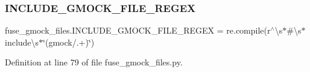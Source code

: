 \subsubsection{\texorpdfstring{I\+N\+C\+L\+U\+D\+E\+\_\+\+G\+M\+O\+C\+K\+\_\+\+F\+I\+L\+E\+\_\+\+R\+E\+G\+EX}{INCLUDE\_GMOCK\_FILE\_REGEX}}
{\footnotesize\ttfamily fuse\+\_\+gmock\+\_\+files.\+I\+N\+C\+L\+U\+D\+E\+\_\+\+G\+M\+O\+C\+K\+\_\+\+F\+I\+L\+E\+\_\+\+R\+E\+G\+EX = re.\+compile(r\textquotesingle{}$^\wedge$\textbackslash{}s$\ast$\#\textbackslash{}s$\ast$include\textbackslash{}s$\ast$\char`\"{}(gmock/.+)\char`\"{}\textquotesingle{})}



Definition at line 79 of file fuse\+\_\+gmock\+\_\+files.\+py.


